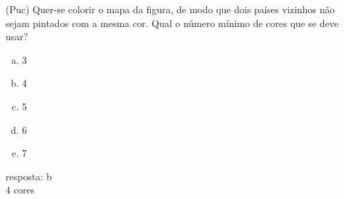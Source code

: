 \begin{ex}
   (Puc) Quer-se colorir o mapa da figura, de modo que dois países vizinhos não sejam  pintados com a mesma cor. Qual o número mínimo de cores que se deve usar?
 \begin{center}
 \end{center}
    \begin{enumerate}[(a)]
    \item 3
    \item 4
    \item 5
    \item 6
    \item 7
    \end{enumerate}
      \begin{sol}
        resposta: b\\
        4 cores
      \end{sol}
\end{ex}